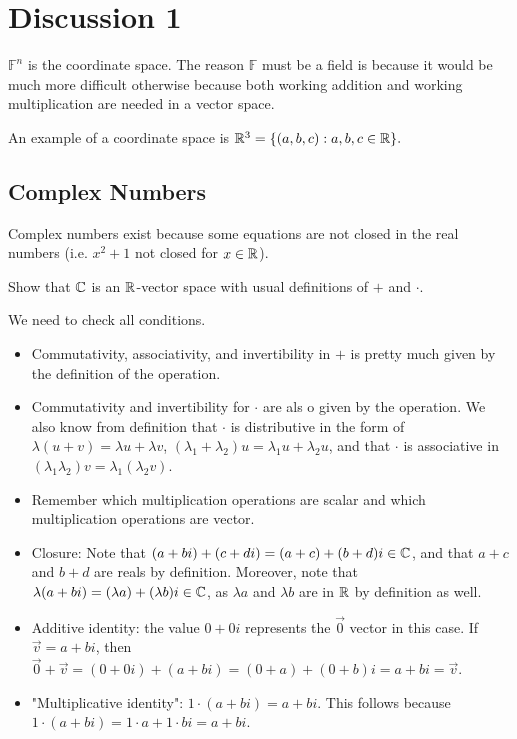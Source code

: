 \documentclass{book}
\begin{document}
\section{Discussion 1}
$\mathbb{F}^n$ is the coordinate space. The reason $\mathbb{F}$ must be a field is because it would be much more difficult otherwise because both working addition and working multiplication are needed in a vector space.

An example of a coordinate space is $\mathbb{R}^3 = \{(a, b, c) : a, b, c \in \mathbb{R}\}.$

\subsection{Complex Numbers}
Complex numbers exist because some equations are not closed in the real numbers (i.e. $x^2 + 1$ not closed for $x \in \mathbb{R}$).

\begin{hw}
	Show that $\mathbb{C}$ is an $\mathbb{R}$-vector space with usual definitions of $+$ and $\cdot$.
\end{hw}

We need to check all conditions. 

\begin{itemize}
	\item Commutativity, associativity, and invertibility in $+$ is pretty much given by the definition of the operation.
	\item Commutativity and invertibility for $\cdot$ are als o given by the operation. We also know from definition that $\cdot$ is distributive in the form of $\lambda (u + v) = \lambda u + \lambda v$, $(\lambda_1 + \lambda_2) u = \lambda_1 u + \lambda_2 u$, and that $\cdot$ is associative in $(\lambda_1 \lambda_2) v = \lambda_1 (\lambda_2 v)$. 
	\item Remember which multiplication operations are scalar and which multiplication operations are vector.
	\item Closure: Note that $(a + bi) + (c + di) = (a + c) + (b + d)i \in \mathbb{C}$, and that $a + c$ and $b + d$ are reals by definition. Moreover, note that $\lambda (a + bi) = (\lambda a) + (\lambda b)i \in \mathbb{C}$, as $\lambda a$ and $\lambda b$ are in $\mathbb{R}$ by definition as well.
	\item Additive identity: the value $0 + 0i$ represents the $\vec 0$ vector in this case. If $\vec v = a + bi$, then $\vec 0 + \vec v = (0 + 0i) + (a + bi) = (0 + a) + (0 + b)i = a + bi = \vec v$.
	\item "Multiplicative identity": $1 \cdot (a + bi) = a + bi$. This follows because $1 \cdot (a + bi) = 1 \cdot a + 1 \cdot bi = a + bi$.
\end{itemize}
\end{document}
